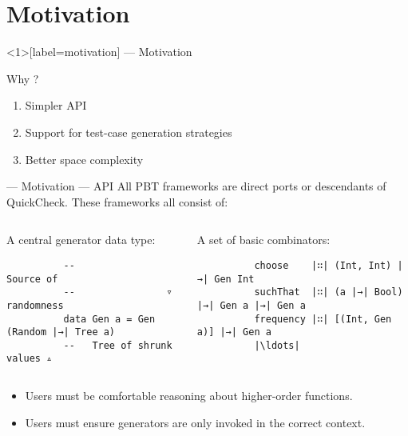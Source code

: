 \section{Motivation}

\begin{frame}<1>[label=motivation]{\halcheck{} --- Motivation}
  \begin{block}{Why \halcheck?}
    \begin{enumerate}
      \item<alert@1> Simpler API
      \item<alert@2> Support for test-case generation strategies
      \item<alert@3> Better space complexity
    \end{enumerate}
  \end{block}
\end{frame}

\begin{frame}[fragile]{\halcheck{} --- Motivation --- API}
  All PBT frameworks are direct ports or descendants of QuickCheck. These frameworks all consist of:

  \bigskip{}
  \pause{}

  \begin{columns}
    \begin{column}{0.4\textwidth}
      \begin{block}{A central generator data type:}
        \begin{verbatim}
          --                  Source of
          --                ▿ randomness
          data Gen a = Gen (Random |→| Tree a)
          --   Tree of shrunk values ▵
        \end{verbatim}
      \end{block}
    \end{column}

    \pause{}

    \begin{column}{0.5\textwidth}
      \begin{block}{A set of basic combinators:}
        \begin{verbatim}
          choose    |∷| (Int, Int) |→| Gen Int
          suchThat  |∷| (a |→| Bool) |→| Gen a |→| Gen a
          frequency |∷| [(Int, Gen a)] |→| Gen a
          |\ldots|
        \end{verbatim}
      \end{block}
    \end{column}
  \end{columns}

  \pause{}

  \bigskip{}

  \begin{itemize}
    \item Users must be comfortable reasoning about higher-order functions.
    \item Users must ensure generators are only invoked in the \alert{correct context}.
  \end{itemize}
\end{frame}

